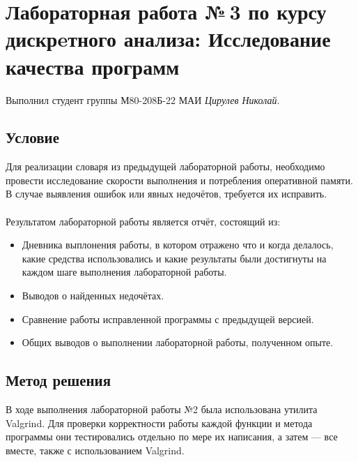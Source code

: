 \documentclass[12pt]{article}
\begin{document}
\section*{Лабораторная работа №\,3 по курсу дискрeтного анализа: Исследование качества
программ}

Выполнил студент группы М80-208Б-22 МАИ \textit{Цирулев Николай}.

\subsection*{Условие}
Для реализации словаря из предыдущей лабораторной работы,
необходимо провести исследование скорости выполнения и потребления
оперативной памяти. В случае выявления ошибок или явных недочётов,
требуется их исправить.
\\\\
Результатом лабораторной работы является отчёт, состоящий из:
\begin{itemize}
\item
    Дневника выплонения работы, в котором отражено что и когда
    делалось, какие средства использовались и какие результаты были
    достигнуты на каждом шаге выполнения лабораторной работы.
\item
    Выводов о найденных недочётах.
\item
    Сравнение работы исправленной программы с предыдущей версией.
\item
    Общих выводов о выполнении лабораторной работы, полученном
    опыте.
\end{itemize}

\subsection*{Метод решения}

В ходе выполнения лабораторной работы №2 была использована утилита Valgrind. Для проверки корректности работы каждой функции и метода программы они тестировались отдельно по мере их написания, а затем — все вместе, также с использованием Valgrind.
\end{document}
